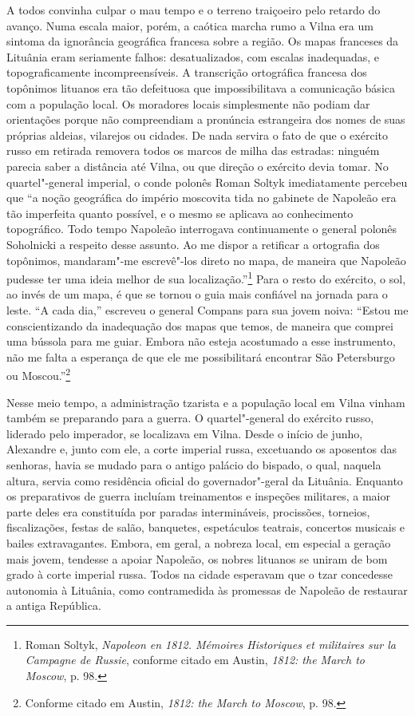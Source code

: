 A todos convinha culpar o mau tempo e o terreno traiçoeiro pelo retardo
do avanço. Numa escala maior, porém, a caótica marcha rumo a Vilna era
um sintoma da ignorância geográfica francesa sobre a região. Os mapas
franceses da Lituânia eram seriamente falhos: desatualizados, com
escalas inadequadas, e topograficamente incompreensíveis. A transcrição
ortográfica francesa dos topônimos lituanos era tão defeituosa que
impossibilitava a comunicação básica com a população local. Os moradores
locais simplesmente não podiam dar orientações porque não compreendiam a
pronúncia estrangeira dos nomes de suas próprias aldeias, vilarejos ou
cidades. De nada servira o fato de que o exército russo em retirada
removera todos os marcos de milha das estradas: ninguém parecia saber a
distância até Vilna, ou que direção o exército devia tomar. No
quartel"-general imperial, o conde polonês Roman Soltyk imediatamente
percebeu que ``a noção geográfica do império moscovita tida no gabinete
de Napoleão era tão imperfeita quanto possível, e o mesmo se aplicava ao
conhecimento topográfico. Todo tempo Napoleão interrogava continuamente
o general polonês Soholnicki a respeito desse assunto. Ao me dispor a
retificar a ortografia dos topônimos, mandaram"-me escrevê"-los direto no
mapa, de maneira que Napoleão pudesse ter uma ideia melhor de sua
localização.''\footnote{Roman Soltyk, \textit{Napoleon en 1812. Mémoires Historiques et militaires sur la Campagne de Russie}, conforme citado em Austin, \textit{1812: the March to Moscow}, p. 98.} Para o resto do exército, o sol, ao invés de um mapa, é que se tornou o guia mais
confiável na jornada para o leste. ``A cada dia,'' escreveu o general
Compans para sua jovem noiva: ``Estou me conscientizando da inadequação
dos mapas que temos, de maneira que comprei uma bússola para me guiar.
Embora não esteja acostumado a esse instrumento, não me falta a
esperança de que ele me possibilitará encontrar São Petersburgo ou
Moscou.''\footnote{Conforme citado em Austin, \textit{1812: the March to Moscow}, p. 98.}

Nesse meio tempo, a administração tzarista e a população local em Vilna
vinham também se preparando para a guerra. O quartel"-general do exército
russo, liderado pelo imperador, se localizava em Vilna. Desde o início
de junho, Alexandre e, junto com ele, a corte imperial russa, excetuando
os aposentos das senhoras, havia se mudado para o antigo palácio do
bispado, o qual, naquela altura, servia como residência oficial do
governador"-geral da Lituânia. Enquanto os preparativos de guerra
incluíam treinamentos e inspeções militares, a maior parte deles era
constituída por paradas intermináveis, procissões, torneios,
fiscalizações, festas de salão, banquetes, espetáculos teatrais,
concertos musicais e bailes extravagantes. Embora, em geral, a nobreza
local, em especial a geração mais jovem, tendesse a apoiar Napoleão, os
nobres lituanos se uniram de bom grado à corte imperial russa. Todos na
cidade esperavam que o tzar concedesse autonomia à Lituânia, como
contramedida às promessas de Napoleão de restaurar a antiga República.

